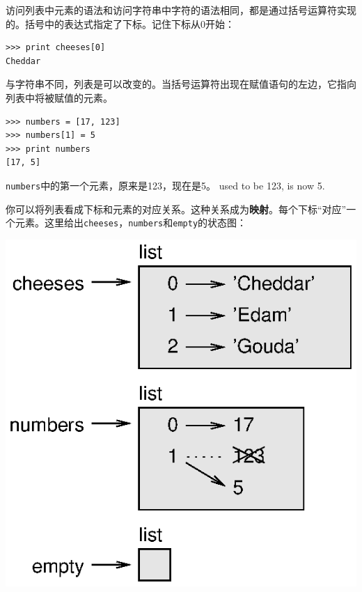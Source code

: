 
访问列表中元素的语法和访问字符串中字符的语法相同，都是通过括号运算符实现的。括号中的表达式指定了下标。记住下标从0开始：

\beforeverb
\begin{verbatim}
>>> print cheeses[0]
Cheddar
\end{verbatim}
\afterverb
%
与字符串不同，列表是可以改变的。当括号运算符出现在赋值语句的左边，它指向列表中将被赋值的元素。


\beforeverb
\begin{verbatim}
>>> numbers = [17, 123]
>>> numbers[1] = 5
>>> print numbers
[17, 5]
\end{verbatim}
\afterverb
%
{\tt numbers}中的第一个元素，原来是123，现在是5。
used to be 123, is now 5.


你可以将列表看成下标和元素的对应关系。这种关系成为{\bf 映射}。每个下标“对应”一个元素。这里给出{\tt cheeses}，{\tt numbers}和{\tt empty}的状态图：


\beforefig
\centerline{\includegraphics{figs/list_state.eps}}
\afterfig

